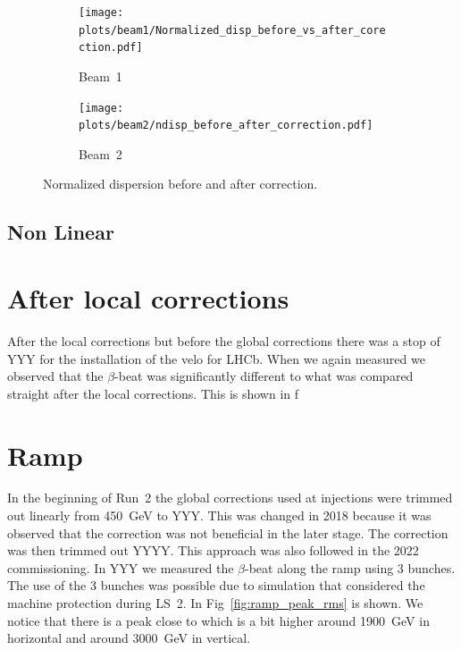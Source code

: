 \documentclass{cernatsnote}
\begin{document}
\begin{figure}[ht]
\begin{subfigure}{.5\textwidth}
  \centering
  \texttt{[image: plots/beam1/Normalized\_disp\_before\_vs\_after\_corection.pdf]}  
  \caption{Beam~1}
\end{subfigure}
\begin{subfigure}{.5\textwidth}
  \centering
  \texttt{[image: plots/beam2/ndisp\_before\_after\_correction.pdf]}  
  \caption{Beam~2}
\end{subfigure}
\caption{Normalized dispersion before and after correction.}
\label{fig:before_after_correction_beta_beat}
\end{figure}

\subsection{Non Linear}
\section{After local corrections}
After the local corrections but before the global corrections there was a stop of YYY for the installation of the velo for LHCb. When we again measured we observed that the $\beta$-beat was significantly different to what was compared straight after the local corrections. This is shown in f

\section{Ramp}
In the beginning of Run~2 the global corrections used at injections were trimmed out linearly from 450~GeV to YYY. This was changed in 2018 because it was observed that the correction was not beneficial in the later stage. The correction was then trimmed out YYYY. This approach was also followed in the 2022 commissioning. In YYY we measured the $\beta$-beat along the ramp using 3 bunches. The use of the 3 bunches was possible due to simulation that considered the machine protection during LS~2\cite{}. In Fig~\ref{fig:ramp_peak_rms} is shown. We notice that there is a peak close to which is a bit higher around 1900~GeV in horizontal and around 3000~GeV in vertical. 
\end{document}
